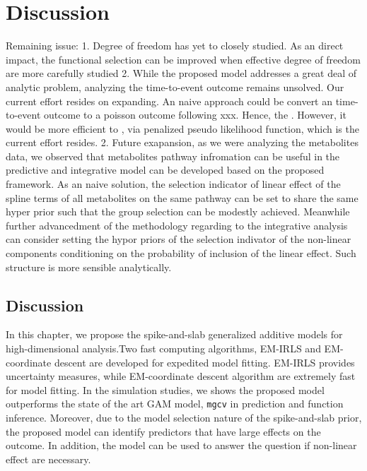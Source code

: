 \documentclass[AMA,STIX1COL,]{WileyNJD-v2}
\begin{document}
\hypertarget{discussion}{%
\section{Discussion}\label{discussion}}

Remaining issue: 1. Degree of freedom has yet to closely studied. As an
direct impact, the functional selection can be improved when effective
degree of freedom are more carefully studied 2. While the proposed model
addresses a great deal of analytic problem, analyzing the time-to-event
outcome remains unsolved. Our current effort resides on expanding. An
naive approach could be convert an time-to-event outcome to a poisson
outcome following xxx. Hence, the . However, it would be more efficient
to , via penalized pseudo likelihood function, which is the current
effort resides. 2. Future exapansion, as we were analyzing the
metabolites data, we observed that metabolites pathway infromation can
be useful in the predictive and integrative model can be developed based
on the proposed framework. As an naive solution, the selection indicator
of linear effect of the spline terms of all metabolites on the same
pathway can be set to share the same hyper prior such that the group
selection can be modestly achieved. Meanwhile further advancedment of
the methodology regarding to the integrative analysis can consider
setting the hypor priors of the selection indivator of the non-linear
components conditioning on the probability of inclusion of the linear
effect. Such structure is more sensible analytically.

\hypertarget{discussion-1}{%
\subsection{Discussion}\label{discussion-1}}

In this chapter, we propose the spike-and-slab generalized additive
models for high-dimensional analysis.Two fast computing algorithms,
EM-IRLS and EM-coordinate descent are developed for expedited model
fitting. EM-IRLS provides uncertainty measures, while EM-coordinate
descent algorithm are extremely fast for model fitting. In the
simulation studies, we shows the proposed model outperforms the state of
the art GAM model, \texttt{mgcv} in prediction and function inference.
Moreover, due to the model selection nature of the spike-and-slab prior,
the proposed model can identify predictors that have large effects on
the outcome. In addition, the model can be used to answer the question
if non-linear effect are necessary.
\end{document}
